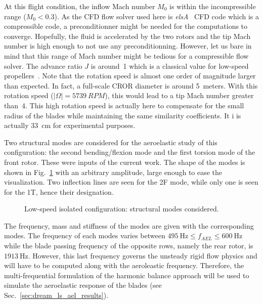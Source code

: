 At this flight condition, the inflow Mach 
number $M_0$ is within the incompressible range
($M_0 < 0.3$). As the CFD flow solver used here is 
\textit{elsA}~\cite{Cambier2013} CFD code which is a compressible code, 
a preconditionner might be needed for the computations to converge. 
Hopefully, the fluid is accelerated by the two rotors
and the tip Mach number is high enough to not use any preconditionning.
However, let us bare in mind that this range of Mach number might
be tedious for a compressible flow solver.
The advance ratio $J$ is around~1 which is a classical value for
low-speed propellers~\cite{Bousquet2012}. Note that the rotation speed is almost
one order of magnitude larger than expected. 
In fact, a full-scale CROR diameter is around 5~meters. With this rotation speed
($|\Omega|=5739~RPM$),
this would lead to a tip Mach number greater than~4. This high rotation speed is 
actually here to compensate for the small radius of the blades 
while maintaining the same similarity coefficients. It i
is actually 33~cm for experimental purposes.

Two structural modes are considered for the aeroelastic study of this 
configuration: the second bending/flexion mode and the first torsion mode
of the front rotor. These were inputs of the current work.
The shape of the modes is shown in Fig.~\ref{fig:dream_ls_ael_modes}
with an arbitrary amplitude, large enough to ease the visualization.
Two inflection lines are seen for the 2F mode, while only
one is seen for the 1T, hence their designation.
\begin{figure}[htp]
  \centering
  \caption{Low-speed isolated configuration: structural modes considered.}
  \label{fig:dream_ls_ael_modes}
\end{figure}
The frequency, mass and stiffness of the modes 
are given with the corresponding modes.
The frequency of each modes varies between 
$495~\textrm{Hz} \leq f_{AEL} \leq 600~\textrm{Hz}$
while the blade passing frequency of the opposite rows,
namely the rear rotor, is $1913~\textrm{Hz}$. However,
this last frequency governs the unsteady rigid flow physics 
and will have to be computed along with the aeroleastic frequency.
Therefore, the multi-frequential formulation of the
harmonic balance approach will be used to simulate the
aeroelastic response of the blades (see Sec.~\ref{sec:dream_ls_ael_results}).
